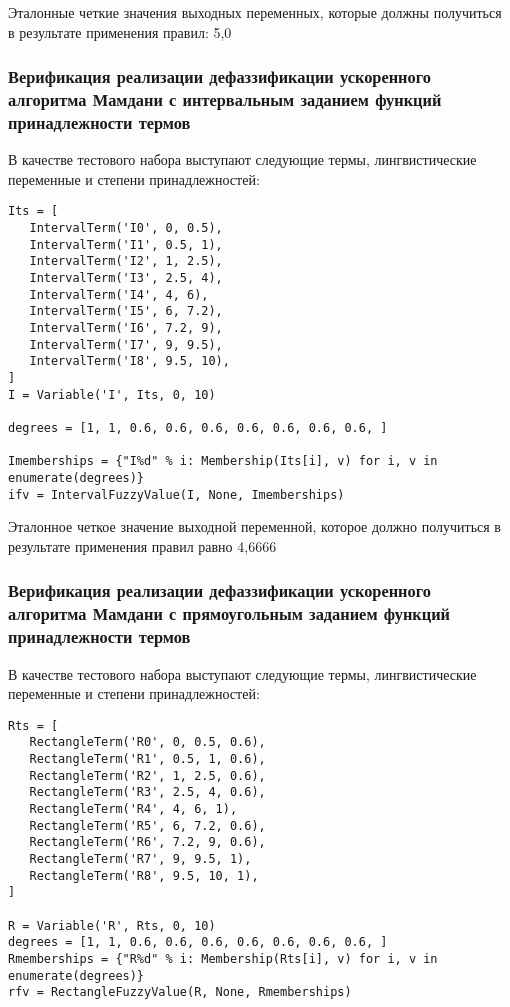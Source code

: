 Эталонные четкие значения выходных переменных, которые должны получиться в результате применения правил: 5,0

\subsubsection{Верификация реализации дефаззификации ускоренного алгоритма Мамдани с интервальным заданием функций принадлежности термов }

В качестве тестового набора выступают следующие термы, лингвистические переменные и степени принадлежностей:

\begin{lstlisting}[style=pythonstyle,caption={  }, label=lst:func:1]
Its = [
   IntervalTerm('I0', 0, 0.5),
   IntervalTerm('I1', 0.5, 1),
   IntervalTerm('I2', 1, 2.5),
   IntervalTerm('I3', 2.5, 4),
   IntervalTerm('I4', 4, 6),
   IntervalTerm('I5', 6, 7.2),
   IntervalTerm('I6', 7.2, 9),
   IntervalTerm('I7', 9, 9.5),
   IntervalTerm('I8', 9.5, 10),
]
I = Variable('I', Its, 0, 10)

degrees = [1, 1, 0.6, 0.6, 0.6, 0.6, 0.6, 0.6, 0.6, ]

Imemberships = {"I%d" % i: Membership(Its[i], v) for i, v in enumerate(degrees)}
ifv = IntervalFuzzyValue(I, None, Imemberships)
\end{lstlisting}


Эталонное четкое значение выходной переменной, которое должно получиться в результате применения правил равно 4,6666

\subsubsection{Верификация реализации дефаззификации ускоренного алгоритма Мамдани с прямоугольным заданием функций принадлежности термов }

В качестве тестового набора выступают следующие термы, лингвистические переменные и степени принадлежностей:

\begin{lstlisting}[style=pythonstyle,caption={  }, label=lst:func:1]
Rts = [
   RectangleTerm('R0', 0, 0.5, 0.6),
   RectangleTerm('R1', 0.5, 1, 0.6),
   RectangleTerm('R2', 1, 2.5, 0.6),
   RectangleTerm('R3', 2.5, 4, 0.6),
   RectangleTerm('R4', 4, 6, 1),
   RectangleTerm('R5', 6, 7.2, 0.6),
   RectangleTerm('R6', 7.2, 9, 0.6),
   RectangleTerm('R7', 9, 9.5, 1),
   RectangleTerm('R8', 9.5, 10, 1),
]

R = Variable('R', Rts, 0, 10)
degrees = [1, 1, 0.6, 0.6, 0.6, 0.6, 0.6, 0.6, 0.6, ]
Rmemberships = {"R%d" % i: Membership(Rts[i], v) for i, v in enumerate(degrees)}
rfv = RectangleFuzzyValue(R, None, Rmemberships)
\end{lstlisting}

